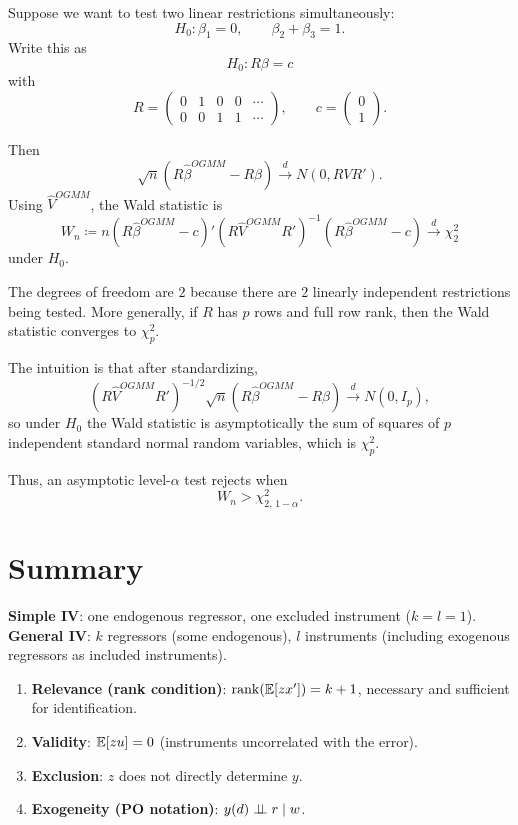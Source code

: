 \begin{example}
	Suppose we want to test two linear restrictions simultaneously:
	\[
		H_0:\beta_1=0,\qquad \beta_2+\beta_3=1
	.\]
	Write this as
	\[
		H_0:R\beta=c
	\]
	with
	\[
		R=
		\begin{pmatrix}
			0 & 1 & 0 & 0 & \cdots \\
			0 & 0 & 1 & 1 & \cdots
		\end{pmatrix},
		\qquad
		c=
		\begin{pmatrix}
			0\\
			1
		\end{pmatrix}
	.\]

	Then
	\[
		\sqrt{n}\left(R\hat{\beta}^{OGMM}-R\beta\right)\xrightarrow{d}N(0,RVR')
	.\]
	Using $\hat{V}^{OGMM}$, the Wald statistic is
	\[
		W_n
		\coloneqq
		n\left(R\hat{\beta}^{OGMM}-c\right)'
		\left(R\hat{V}^{OGMM}R'\right)^{-1}
		\left(R\hat{\beta}^{OGMM}-c\right)
		\xrightarrow{d}\chi^2_2
	\]
	under $H_0$.

	The degrees of freedom are $2$ because there are $2$ linearly independent restrictions being tested. More generally, if $R$ has $p$ rows and full row rank, then the Wald statistic converges to $\chi^2_p$.

	The intuition is that after standardizing,
	\[
		\left(R\hat{V}^{OGMM}R'\right)^{-1/2}\sqrt{n}\left(R\hat{\beta}^{OGMM}-R\beta\right)
		\xrightarrow{d}N(0,I_p),
	\]
	so under $H_0$ the Wald statistic is asymptotically the sum of squares of $p$ independent standard normal random variables, which is $\chi^2_p$.

	Thus, an asymptotic level-$\alpha$ test rejects when
	\[
		W_n>\chi^2_{2,\,1-\alpha}
	.\]
\end{example}
\section{Summary}

\begin{remark}
	\leavevmode\hfill\break
	\textbf{Simple IV}: one endogenous regressor, one excluded instrument ($k=l=1$). \\
	\textbf{General IV}: $k$ regressors (some endogenous), $l$ instruments (including exogenous regressors as included instruments).
\end{remark}

\begin{remark}
	\leavevmode\hfill\break
	\begin{enumerate}[label=(\roman*)]
		\item \textbf{Relevance (rank condition)}: $\operatorname{rank}(\mathbb{E}[zx'])=k+1$, necessary and sufficient for identification.
		\item \textbf{Validity}: $\mathbb{E}[zu]=0$ (instruments uncorrelated with the error).
		\item \textbf{Exclusion}: $z$ does not directly determine $y$.
		\item \textbf{Exogeneity (PO notation)}: $y(d)\perp\!\!\!\perp r\mid w$.
	\end{enumerate}
\end{remark}

